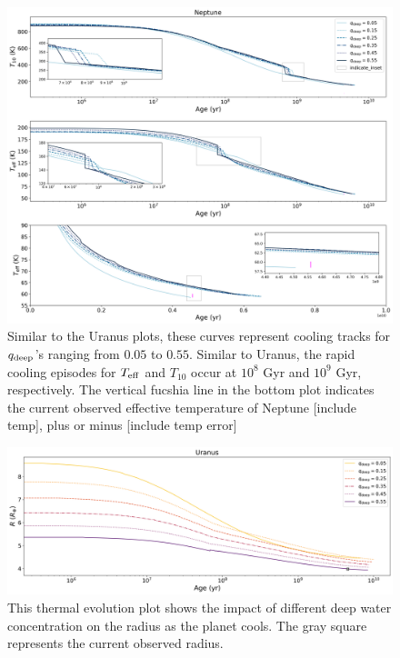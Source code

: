\documentclass[11pt]{ucscthesisbs}
\begin{document}
\begin{figure}[ht]
 \centerline{
  \includegraphics[scale=0.45]{figures/n_cooling_curves_nz_4096_more_qdeeps.png}
 }
\caption[Thermal Evolution Curves for Neptune - Water Vapor Concentration Comparisons]
{Similar to the Uranus plots, these curves represent cooling tracks for $q_{\rm deep}$'s ranging from $0.05$ to $0.55$. Similar to Uranus, the rapid cooling episodes for $T_{\rm eff}$ and $T_{10}$ occur at $10^8$ Gyr and $10^9$ Gyr, respectively. The vertical fucshia line in the bottom plot indicates the current observed effective temperature of Neptune [include temp], plus or minus [include temp error] }
\label{fig:evolve_neptune_qdeeps}
\end{figure}



\begin{figure}[ht]
 \centerline{
  \includegraphics[scale=0.45]{figures/u_cooling_radius_nz_4096_logx_more_qdeeps.png}
 }
\caption[Thermal Evolution Curves for Uranus - Radius]
{This thermal evolution plot shows the impact of different deep water concentration on the radius as the planet cools. The gray square represents the current observed radius.}
\label{fig:evolve_uranus_radius}
\end{figure}
\end{document}
